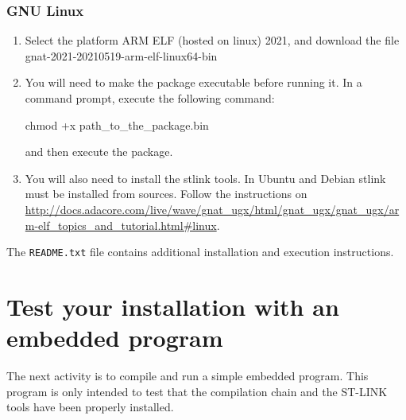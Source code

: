 \subsubsection*{GNU Linux}
\begin{enumerate}
	\item Select the platform ARM ELF (hosted on linux) 2021, and download the file gnat-2021-20210519-arm-elf-linux64-bin
	\item You will need to make the package executable before running it. In a command prompt, execute the following command:
	
	chmod +x path\_to\_the\_package.bin
	
	and then execute the package.
	\item You will also need to install the stlink tools. In Ubuntu and Debian stlink must be installed from sources. Follow the instructions on \url{http://docs.adacore.com/live/wave/gnat\_ugx/html/gnat\_ugx/gnat\_ugx/arm-elf\_topics\_and\_tutorial.html\#linux}.
\end{enumerate}

The {\tt README.txt} file contains additional installation and execution instructions.

\section{Test your installation with an embedded program}

The next activity is to compile and run a simple embedded program.
This program is only intended to test that the compilation chain
and the ST-LINK tools have been properly installed.

